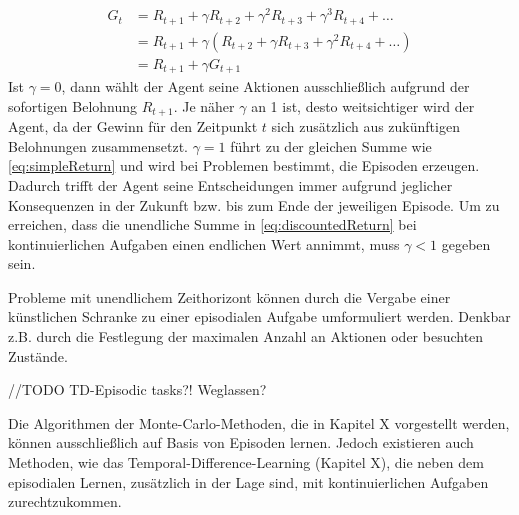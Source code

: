 \begin{equation}\label{eq:successiveReturn}
    \begin{aligned}
    G_t &= R_{t+1} + \gamma R_{t+2} + \gamma^2 R_{t+3} + \gamma^3 R_{t+4} + \dots \\
    &= R_{t+1} + \gamma (R_{t+2} + \gamma R_{t+3} + \gamma^2 R_{t+4} + \dots)  \\
   & = R_{t+1} + \gamma G_{t+1}
    \end{aligned}
\end{equation}
Ist $\gamma = 0$, dann wählt der Agent seine Aktionen ausschließlich aufgrund der sofortigen Belohnung $R_{t+1}$. Je näher $\gamma$ an 1 ist, desto \glqq weitsichtiger\grqq{} wird der Agent, da der Gewinn für den Zeitpunkt $t$ sich zusätzlich aus zukünftigen Belohnungen zusammensetzt. $\gamma = 1$ führt zu der gleichen Summe wie \eqref{eq:simpleReturn} und wird bei Problemen bestimmt, die Episoden erzeugen. Dadurch trifft der Agent seine Entscheidungen immer aufgrund jeglicher Konsequenzen in der Zukunft bzw. bis zum Ende der jeweiligen Episode. Um zu erreichen, dass die unendliche Summe in \eqref{eq:discountedReturn} bei kontinuierlichen Aufgaben einen endlichen Wert annimmt, muss $\gamma < 1$ gegeben sein.
\par 
Probleme mit unendlichem Zeithorizont können durch die Vergabe einer künstlichen Schranke zu einer episodialen Aufgabe umformuliert werden. Denkbar z.B. durch die Festlegung der maximalen Anzahl an Aktionen oder besuchten Zustände. 
\par 
//TODO TD-Episodic tasks?! Weglassen?
\par
Die Algorithmen der Monte-Carlo-Methoden, die in Kapitel X vorgestellt werden, können ausschließlich auf Basis von Episoden lernen. Jedoch existieren auch Methoden, wie das Temporal-Difference-Learning (Kapitel X), die neben dem episodialen Lernen, zusätzlich in der Lage sind, mit kontinuierlichen Aufgaben zurechtzukommen. 